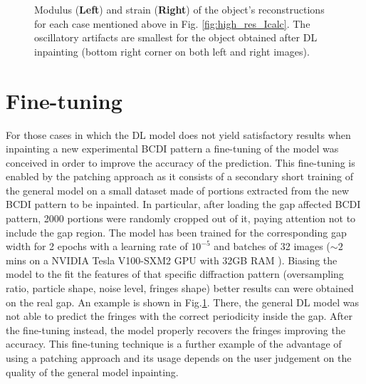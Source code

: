 \begin{figure}[H]
\begin{subfigure}{0.47\textwidth}
        \caption*{}
    \end{subfigure}
    \caption{Modulus (\textbf{Left}) and strain (\textbf{Right}) of the object's reconstructions for each case mentioned 
    above in Fig. \ref{fig:high_res_Icalc}. The oscillatory artifacts are smallest for the object obtained after DL 
    inpainting (bottom right corner on both left and right images).}
    \label{fig:high_res_obj}
\end{figure}

\section{Fine-tuning}\label{sec:finetuning}
For those cases in which the DL model does not yield satisfactory results when inpainting a new experimental BCDI pattern 
a fine-tuning of the model was conceived in order to improve the accuracy of the prediction. This fine-tuning is enabled by the 
patching approach as it consists of a secondary short training of the general model on a small dataset made of portions 
extracted from the new BCDI pattern to be inpainted.
In particular, after loading the gap affected BCDI pattern, 2000 portions were randomly cropped out of it, paying attention
not to include the gap region. The model has been trained for the corresponding gap width for 2 epochs with a learning 
rate of $ 10^{-5}$  and batches of 32 images ($\sim 2$ mins on a
NVIDIA Tesla V100-SXM2 GPU with 32GB RAM ). Biasing the
model to the fit the features of that specific diffraction pattern (oversampling ratio, particle shape, noise level, fringes shape)
better results can were obtained on the real gap. An example is shown in Fig.\ref{sec:finetuning}. There, the general DL model
was not able to predict the fringes with the correct periodicity inside the gap. After the fine-tuning instead, the model 
properly recovers the fringes improving the accuracy. 
This fine-tuning technique is a further example of the advantage of using a patching approach and its usage depends
on the user judgement on the quality of the general model inpainting. 

